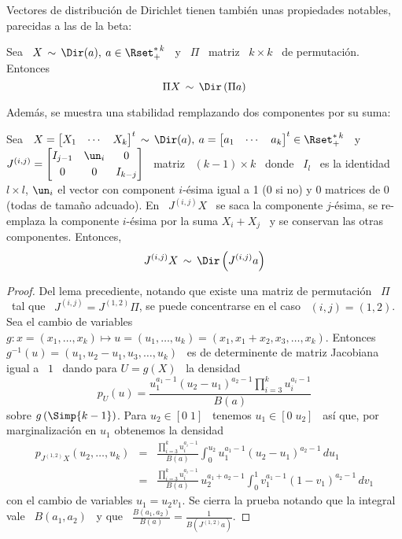 Vectores  de  distribuci\'on  de  Dirichlet tienen  tambi\'en  unas  propiedades
notables, parecidas a las de la beta:
%
\begin{lema}[Reflexividad]
\label{Lem:MP:ReflexividadDir}
%
Sea \ $X \, \sim  \, \Dir(a), \: a \in \Rset_+^{* \, k}$ \  y \ $\Pi$ \ matriz \
$k \times k$ \ de permutaci\'on. Entonces
  \[
  \Pi X \, \sim \, \Dir\left( \Pi a \right)
  \]
\end{lema}
%
Adem\'as, se muestra una stabilidad remplazando dos componentes por su suma:
%
\begin{lema}
\label{Lem:MP:StabSumaDir}
%
  Sea  \ $X =  \begin{bmatrix} X_1  & \cdots  & X_k  \end{bmatrix}^t \,  \sim \,
  \Dir(a), \: a = \begin{bmatrix} a_1 & \cdots & a_k \end{bmatrix}^t \in
  \Rset_+^{* \, k}$ \ y \ $J^{(i,j)} = \begin{bmatrix} I_{j-1} & \un_i & 0 \\[1mm]
    0 & 0 & I_{k-j}\end{bmatrix}$ \ matriz  \ $(k-1) \times k$ \ donde \ $I_l$ \
  es  la identidad $l  \times l$,  $\un_i$ el  vector con  component $i$-\'esima
  igual a  1 (0 si no)  y $0$ matrices de  0 (todas de tama\~no  adcuado).  En \
  $J^{(i,j)} X$ \ se saca la componente $j$-\'esima, se re-emplaza la componente
  $i$-\'esima  por   la  suma  $X_i   +  X_j$  \   y  se  conservan   las  otras
  componentes. Entonces,
  \[
  J^{(i,j)} X \, \sim \, \Dir\left( J^{(i,j)} a \right)  
  \]
\end{lema}
%
\begin{proof}
  Del lema precediente, notando que existe una matriz de permutaci\'on \ $\Pi$ \
  tal que  \ $J^{(i,j)}  = J^{(1,2)} \Pi$,  se puede  concentrarse en el  caso \
  $(i,j) = (1,2)$. Sea el cambio de variables $g: x = (x_1,\ldots,x_k) \mapsto u
  =  (u_1,\ldots,u_k) = (x_1,x_1+x_2,x_3,\ldots,x_k)$.  Entonces \  $g^{-1}(u) =
  (u_1,u_2-u_1,u_3,\ldots,u_k)$ \ es de determinente de matriz Jacobiana igual a
  \ $1$ \ dando para $U = g(X)$ \ la densidad
  \[
  p_U(u)  = \frac{u_1^{a_1-1}  \left(  u_2 -  u_1 \right)^{a_2-1}  \prod_{i=3}^k
    u_i^{a_i-1}}{B(a)}
  \]
  sobre $g\left(  \Simp{k-1} \right)$. Para $u_2  \in [0 \; 1]$  \ tenemos $u_1
  \in [  0 \;  u_2]$ \ as\'i  que, por  marginalizaci\'on en $u_1$  obtenemos la
  densidad
  \begin{eqnarray*}
  p_{J^{(1,2)} X}(u_2,\ldots,u_k) & = & \frac{\prod_{i=3}^k u_i^{a_i-1}}{B(a)}
  \int_0^{u_2} u_1^{a_1-1} \left( u_2 - u_1 \right)^{a_2-1} \, du_1\\[2mm]
  & = & \frac{\prod_{i=3}^k u_i^{a_i-1}}{B(a)} \, u_2^{a_1+a_2-1} \int_0^1
  v_1^{a_1-1} \left( 1 - v_1 \right)^{a_2-1} \, dv_1
  \end{eqnarray*}
  con el cambio de variables $u_1 = u_2 v_1$. Se cierra la prueba notando que la
  integral   vale  \  $B(a_1,a_2)$   \  y   que  \   $\frac{B(a_1,a_2)}{B(a)}  =
  \frac{1}{B\left( J^{(1,2)} a \right)}$.
\end{proof}

